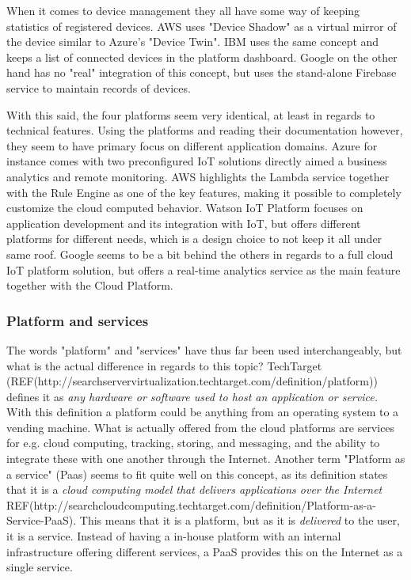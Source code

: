 When it comes to device management they all have some way of keeping statistics of registered devices. AWS uses "Device Shadow" as a virtual mirror of the device similar to Azure's "Device Twin". IBM uses the same concept and keeps a list of connected devices in the platform dashboard. Google on the other hand has no "real" integration of this concept, but uses the stand-alone Firebase service to maintain records of devices. 

With this said, the four platforms seem very identical, at least in regards to technical features. Using the platforms and reading their documentation however, they seem to have primary focus on different application domains. Azure for instance comes with two preconfigured IoT solutions directly aimed a business analytics and remote monitoring. AWS highlights the Lambda service together with the Rule Engine as one of the key features, making it possible to completely customize the cloud computed behavior. Watson IoT Platform focuses on application development and its integration with IoT, but offers different platforms for different needs, which is a design choice to not keep it all under same roof. Google seems to be a bit behind the others in regards to a full cloud IoT platform solution, but offers a real-time analytics service as the main feature together with the Cloud Platform.


\subsubsection{Platform and services}
The words "platform" and "services" have thus far been used interchangeably, but what is the actual difference in regards to this topic? TechTarget (REF(http://searchservervirtualization.techtarget.com/definition/platform)) defines it as \textit{any hardware or software used to host an application or service.} With this definition a platform could be anything from an operating system to a vending machine. What is actually offered from the cloud platforms are services for e.g. cloud computing, tracking, storing, and messaging, and the ability to integrate these with one another through the Internet. Another term "Platform as a service" (Paas) seems to fit quite well on this concept, as its definition states that it is a \textit{cloud computing model that delivers applications over the Internet} REF(http://searchcloudcomputing.techtarget.com/definition/Platform-as-a-Service-PaaS). This means that it is a platform, but as it is \textit{delivered} to the user, it is a service. Instead of having a in-house platform with an internal infrastructure offering different services, a PaaS provides this on the Internet as a single service.